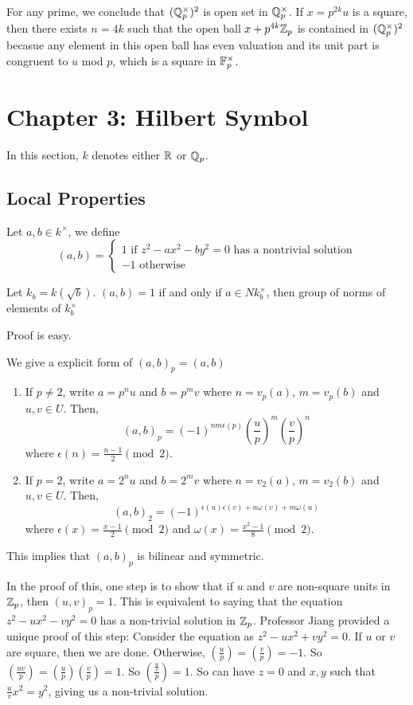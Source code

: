 \documentclass[15pt]{scrartcl}
\newcommand{\legendre}[2]{\left(\frac{#1}{#2}\right)}
\begin{document}
\begin{remark}
    For any prime, we conclude that $(\mathbb Q_p^{\times})^2$ is open set in $\mathbb Q_p^{\times}$. If $x=p^{2k}u$ is a square, then there exists $n=4k$ such that the open ball $x+p^{4k}\mathbb Z_p$ is contained in $(\mathbb Q_p^{\times})^2$ becasue any element in this open ball has even valuation and its unit part is congruent to $u$ mod $p$, which is a square in $\mathbb F_p^{\times}$.
\end{remark}
\newpage
\section{Chapter 3: Hilbert Symbol}
In this section, $k$ denotes either $\mathbb R$ or $\mathbb Q_p$. 
\subsection{Local Properties}
\begin{definition}
    Let $a, b\in k^\times$, we define 
    \[(a,b)=\begin{cases}
        1 \text{ if } z^2-ax^2-by^2=0 \text{ has a nontrivial solution}
        \\

        -1 \text{ otherwise}
    \end{cases}\]
\end{definition}
\begin{proposition}
    Let $k_b=k(\sqrt{b})$. $(a,b)=1$ if and only if $a\in Nk_b^\times$, then group of norms of elements of $k_b^\times $
\end{proposition}
Proof is easy. 

\begin{theorem}
    We give a explicit form of $(a,b)_p=(a,b)$
    \begin{enumerate}
        \item If $p\neq 2$, write $a=p^nu$ and $b=p^mv$ where $n=v_p(a)$, $m=v_p(b)$ and $u,v\in U$. Then,
\[(a,b)_p=(-1)^{nm\epsilon(p)} \left(\frac{u}{p}\right)^m \left(\frac{v}{p}\right)^n\] where $\epsilon(n)=\frac{n-1}{2} \pmod 2$. 
         \item If $p=2$, write $a=2^nu$ and $b=2^mv$ where $n=v_2(a)$, $m=v_2(b)$ and $u,v\in U$. Then,
\[(a,b)_2=(-1)^{\epsilon(u)\epsilon(v)+n\omega(v)+m\omega(u)}\] where $\epsilon(x)=\frac{x-1}{2} \pmod 2$ and $\omega(x)=\frac{x^2-1}{8} \pmod 2$.
    \end{enumerate}
This implies that $(a,b)_p$ is bilinear and symmetric.
\end{theorem}
\begin{remark}
    In the proof of this, one step is to show that if $u$ and $v$ are non-square units in $\mathbb Z_p$, then $(u,v)_p=1$. This is equivalent to saying that the equation $z^2-ux^2-vy^2=0$ has a non-trivial solution in $\mathbb Z_p$. Professor Jiang provided a unique proof of this step: Consider the equation as $z^2-ux^2+vy^2=0$. If $u$ or $v$ are square, then we are done. Otherwise, $\legendre{u}{p}=\legendre{v}{p}=-1$. So $\legendre{uv}{p}=\legendre{u}{p}\legendre{v}{p}=1$. So $\legendre{\frac{u}{v}}{p}=1$. So can have $z=0$ and $x,y$ such that $\frac{u}{v}x^2=y^2$, giving us a non-trivial solution.
\end{remark}
\end{document}
